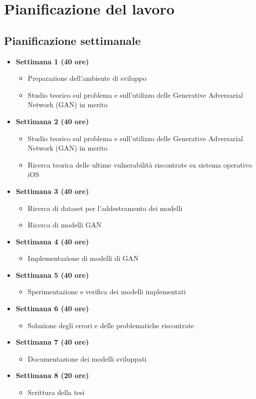 \section{Pianificazione del lavoro}
\subsection*{Pianificazione settimanale}
\begin{itemize}
  \item \textbf{Settimana 1 (40 ore)}
  \begin{itemize}
    \item Preparazione dell'ambiente di sviluppo
    \item Studio teorico sul problema e sull'utilizzo delle Generative Adversarial Network (GAN) in merito
  \end{itemize}

  \item \textbf{Settimana 2 (40 ore)}
  \begin{itemize}
    \item Studio teorico sul problema e sull'utilizzo delle Generative Adversarial Network (GAN) in merito
    \item Ricerca teorica delle ultime vulnerabilità riscontrate su sistema operativo iOS
  \end{itemize}

  \item \textbf{Settimana 3 (40 ore)}
  \begin{itemize}
    \item Ricerca di dataset per l'addestramento dei modelli
    \item Ricerca di modelli GAN
  \end{itemize}

  \item \textbf{Settimana 4 (40 ore)}
  \begin{itemize}
    \item Implementazione di modelli di GAN
  \end{itemize}

  \item \textbf{Settimana 5 (40 ore)}
  \begin{itemize}
    \item Sperimentazione e verifica dei modelli implementati
  \end{itemize}

  \item \textbf{Settimana 6 (40 ore)}
  \begin{itemize}
    \item Soluzione degli errori e delle problematiche riscontrate
  \end{itemize}

  \item \textbf{Settimana 7 (40 ore)}
  \begin{itemize}
    \item Documentazione dei modelli sviluppati
  \end{itemize}

  \item \textbf{Settimana 8 (20 ore)}
  \begin{itemize}
    \item Scrittura della tesi
  \end{itemize}

\end{itemize}


